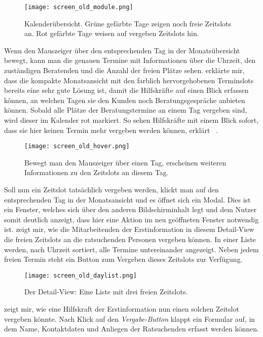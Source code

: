 \begin{figure}[H]
    \caption{Kalenderübersicht. Grüne gefärbte Tage zeigen noch freie Zeitslots an. Rot gefärbte Tage weisen auf vergeben Zeitslots hin.}
    \centering
    \texttt{[image: screen\_old\_module.png]}
\end{figure}

Wenn \ipName den Mauszeiger über den entsprechenden Tag in der Monatsübersicht
bewegt, kann man die genauen Termine mit Informationen über die Uhrzeit, den
zuständigen Beratenden und die Anzahl der freien Plätze sehen. \ipName erklärte
mir, dass die kompakte Monatsansicht mit den farblich hervorgehobenen
Terminslots bereits eine sehr gute Lösung ist, damit die Hilfskräfte auf einen
Blick erfassen können, an welchen Tagen sie den Kunden noch Beratungsgespräche
anbieten können. Sobald alle Plätze der Beratungstermine an einem Tag vergeben
sind, wird dieser im Kalender rot markiert. \glqq{}So sehen Hilfskräfte mit
einem Blick sofort, dass sie hier keinen Termin mehr vergeben werden
können\grqq{}, erklärt \ipName ~\cite{claves}.

\begin{figure}[H]
    \caption{Bewegt man den Mauszeiger über einen Tag, erscheinen weiteren Informationen zu den Zeitslots an diesem Tag.}
    \centering
    \texttt{[image: screen\_old\_hover.png]}
\end{figure}

Soll nun ein Zeitslot tatsächlich vergeben werden, klickt man auf den
entsprechenden Tag in der Monatsansicht und es öffnet sich ein \gls{Modal}.
Dies ist ein Fenster, welches sich über den anderen Bildschirminhalt legt und
dem Nutzer somit deutlich anzeigt, dass hier eine Aktion im neu geöffneten
Fenster notwendig ist. \ipName zeigt mir, wie die Mitarbeitenden der
Erstinformation in diesem Detail-\gls{View} die freien Zeitslots an die
ratsuchenden Personen vergeben können. In einer Liste werden, nach Uhrzeit
sortiert, alle Termine untereinander angezeigt. Neben jedem freien Termin steht
ein Button zum Vergeben dieses Zeitslots zur Verfügung.

\begin{figure}[H]
    \caption{Der Detail-View: Eine Liste mit drei freien Zeitslots.}
    \centering
    \texttt{[image: screen\_old\_daylist.png]}
\end{figure}

\ipName zeigt mir, wie eine Hilfskraft der Erstinformation nun einen solchen
Zeitslot vergeben könnte. Nach Klick auf den \textit{Vergabe-Button} klappt ein
Formular auf, in dem Name, Kontaktdaten und Anliegen der Ratsuchenden erfasst
werden können.

